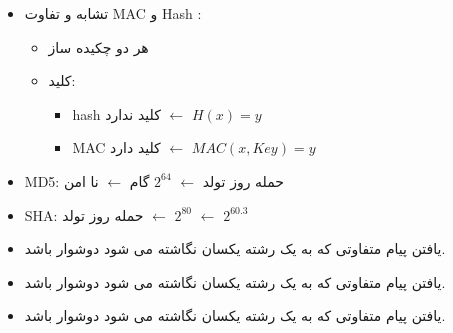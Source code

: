 \documentclass{report}
\begin{document}
\begin{itemize}
	\item 
تشابه و تفاوت MAC و Hash :
		\begin{itemize}
			\item 
			هر دو چکیده ساز 
			\item 
			کلید:
				\begin{itemize}
					\item hash
					کلید ندارد 
					$\leftarrow$
					$H(x) = y$
					\item MAC
					کلید دارد
					$\leftarrow$
					$MAC(x,Key)=y$
				\end{itemize}
		\end{itemize}
	\item 
				MD5:
				حمله روز تولد 
				$\leftarrow$
				$2^{64}$
				گام 
				$\leftarrow$
				نا امن
	\item 
				SHA:
				حمله روز تولد 
				$\leftarrow$
				$2^{80}$
				$\leftarrow$
				$2^{60.3}$
	\item 
یافتن پیام متفاوتی که به یک رشته یکسان نگاشته می شود دوشوار باشد.
	\item 
یافتن پیام متفاوتی که به یک رشته یکسان نگاشته می شود دوشوار باشد.
	\item 
یافتن پیام متفاوتی که به یک رشته یکسان نگاشته می شود دوشوار باشد.
	\end{itemize}
\end{document}
